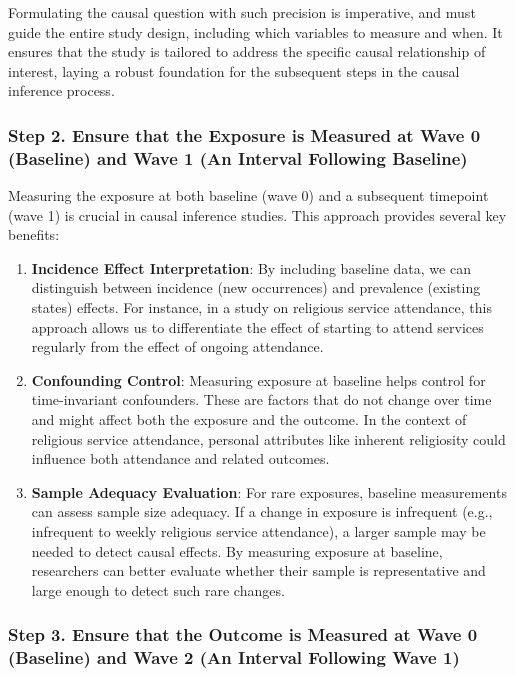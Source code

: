 \documentclass[
  singlecolumn,
  9pt]{article}
\begin{document}
Formulating the causal question with such precision is imperative, and
must guide the entire study design, including which variables to measure
and when. It ensures that the study is tailored to address the specific
causal relationship of interest, laying a robust foundation for the
subsequent steps in the causal inference process.

\subsubsection{Step 2. Ensure that the Exposure is Measured at Wave 0
(Baseline) and Wave 1 (An Interval Following
Baseline)}\label{step-2.-ensure-that-the-exposure-is-measured-at-wave-0-baseline-and-wave-1-an-interval-following-baseline}

Measuring the exposure at both baseline (wave 0) and a subsequent
timepoint (wave 1) is crucial in causal inference studies. This approach
provides several key benefits:

\begin{enumerate}
\def\labelenumi{\arabic{enumi}.}
\item
  \textbf{Incidence Effect Interpretation}: By including baseline data,
  we can distinguish between incidence (new occurrences) and prevalence
  (existing states) effects. For instance, in a study on religious
  service attendance, this approach allows us to differentiate the
  effect of starting to attend services regularly from the effect of
  ongoing attendance.
\item
  \textbf{Confounding Control}: Measuring exposure at baseline helps
  control for time-invariant confounders. These are factors that do not
  change over time and might affect both the exposure and the outcome.
  In the context of religious service attendance, personal attributes
  like inherent religiosity could influence both attendance and related
  outcomes.
\item
  \textbf{Sample Adequacy Evaluation}: For rare exposures, baseline
  measurements can assess sample size adequacy. If a change in exposure
  is infrequent (e.g., infrequent to weekly religious service
  attendance), a larger sample may be needed to detect causal effects.
  By measuring exposure at baseline, researchers can better evaluate
  whether their sample is representative and large enough to detect such
  rare changes.
\end{enumerate}

\subsubsection{Step 3. Ensure that the Outcome is Measured at Wave 0
(Baseline) and Wave 2 (An Interval Following Wave
1)}\label{step-3.-ensure-that-the-outcome-is-measured-at-wave-0-baseline-and-wave-2-an-interval-following-wave-1}
\end{document}

